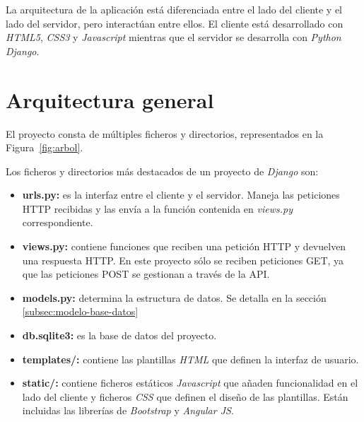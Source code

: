 \documentclass[a4paper, 12pt]{book}
\begin{document}
La arquitectura de la aplicación está diferenciada entre el lado del cliente y el lado del servidor, pero interactúan entre ellos. El cliente está desarrollado con \textit{HTML5}, \textit{CSS3} y \textit{Javascript} mientras que el servidor se desarrolla con \textit{Python Django}.


\section{Arquitectura general} 
\label{sec:arquitectura-general}

El proyecto consta de múltiples ficheros y directorios, representados en la Figura~\ref{fig:arbol}.


Los ficheros y directorios más destacados de un proyecto de \textit{Django} son:

\begin{itemize}
        \item \textbf{urls.py:} es la interfaz entre el cliente y el servidor. Maneja las peticiones HTTP recibidas y las envía a la función contenida en \textit{views.py} correspondiente.
        \item \textbf{views.py:} contiene funciones que reciben una petición HTTP y devuelven una respuesta HTTP. En este proyecto sólo se reciben peticiones GET, ya que las peticiones POST se gestionan a través de la API.
        \item \textbf{models.py:} determina la estructura de datos. Se detalla en la sección \ref{subsec:modelo-base-datos}
        \item \textbf{db.sqlite3:} es la base de datos del proyecto.
        \item \textbf{templates/:} contiene  las plantillas \textit{HTML} que definen la interfaz de usuario.
        \item \textbf{static/:} contiene ficheros estáticos \textit{Javascript} que añaden funcionalidad en el lado del cliente y ficheros \textit{CSS} que definen el diseño de las plantillas. Están incluidas las librerías de \textit{Bootstrap}  y \textit{Angular JS}.
\end{itemize}
\end{document}
